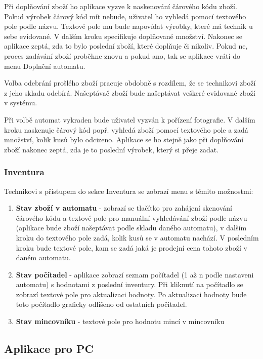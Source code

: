 \documentclass[a4paper,10pt]{article}
\begin{document}
Při doplňování zboží ho aplikace vyzve k naskenování čárového kódu zboží. Pokud výrobek čárový kód mít nebude, uživatel ho vyhledá pomocí textového pole podle názvu. Textové pole mu bude napovídat výrobky, které má technik u sebe evidované. V dalším kroku specifikuje doplňované množství. Nakonec se aplikace zeptá, zda to bylo poslední zboží, které doplňuje či nikoliv. Pokud ne, proces zadávání zboží proběhne znovu a pokud ano, tak se aplikace vrátí do menu Doplnění automatu.

Volba odebrání prošlého zboží pracuje obdobně s rozdílem, že se technikovi zboží z jeho skladu odebírá. Našeptávač zboží bude našeptávat veškeré evidované zboží v systému.

Při volbě automat vykraden bude uživatel vyzván k pořízení fotografie. V dalším kroku naskenuje čárový kód popř. vyhledá zboží pomocí textového pole a zadá množství, kolik kusů bylo odcizeno. Aplikace se ho stejně jako při doplňování zboží nakonec zeptá, zda je to poslední výrobek, který si přeje zadat.

\subsubsection{Inventura}
Technikovi s přístupem do sekce Inventura se zobrazí menu s těmito možnostmi:
\begin{enumerate}
	\item \textbf{Stav zboží v automatu} - zobrazí se tlačítko pro zahájení skenování čárového kódu a textové pole pro manuální vyhledávání zboží podle názvu (aplikace bude zboží našeptávat podle skladu daného automatu), v dalším kroku do textového pole zadá, kolik kusů se v automatu nachází. V posledním kroku bude textové pole, kam se zadá jaká je prodejní cena tohoto zboží v daném automatu.
	\item \textbf{Stav počítadel} - aplikace zobrazí seznam počítadel (1 až n podle nastaveni automatu) s hodnotami z poslední inventury. Při kliknutí na počítadlo se zobrazí textové pole pro aktualizaci hodnoty. Po aktualizaci hodnoty bude toto počítadlo graficky odlišeno od ostatních počitadel.
	\item \textbf{Stav mincovníku} - textové pole pro hodnotu mincí v mincovníku
\end{enumerate}

\subsection{Aplikace pro PC}
\end{document}
